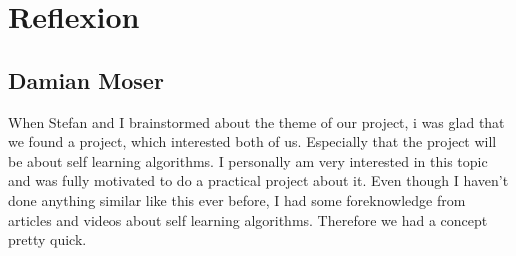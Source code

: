 \begin{dayentry}{}
\end{dayentry}

\begin{dayentry}{}
\end{dayentry}

\begin{dayentry}{}
\end{dayentry}

\begin{dayentry}{}
\end{dayentry}

\begin{dayentry}{}
\end{dayentry}

\begin{dayentry}{}
\end{dayentry}

\begin{dayentry}{}
\end{dayentry}



\section{Reflexion}
\subsection{Damian Moser}
When Stefan and I brainstormed about the theme of our project, i was glad that we found a project, which interested both of us. Especially that the project will be about self learning algorithms. I personally am very interested in this topic and was fully motivated to do a practical project about it. Even though I haven't done anything similar like this ever before, I had some foreknowledge from articles and videos about self learning algorithms. Therefore we had a concept pretty quick. 

